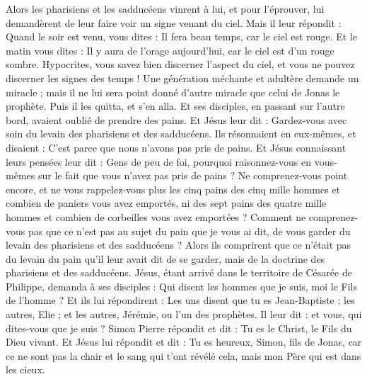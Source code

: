 \begin{multicols}{2}
\VerseOne{}Alors les pharisiens et les sadducéens vinrent à lui, et pour l'éprouver, lui demandèrent de leur faire voir un signe venant du ciel.
Mais il leur répondit : Quand le soir est venu, vous dites : Il fera beau temps, car le ciel est rouge.
Et le matin vous dites : Il y aura de l'orage aujourd'hui, car le ciel est d’un rouge sombre. Hypocrites, vous savez bien discerner l’aspect du ciel, et vous ne pouvez discerner les signes des temps !
Une génération méchante et adultère demande un miracle ; mais il ne lui sera point donné d'autre miracle que celui de Jonas le prophète. Puis il les quitta, et s'en alla.
Et ses disciples, en passant sur l’autre bord, avaient oublié de prendre des pains.
Et Jésus leur dit : Gardez-vous avec soin du levain des pharisiens et des sadducéens.
Ils résonnaient en eux-mêmes, et disaient : C’est parce que nous n'avons pas pris de pains.
Et Jésus connaissant leurs pensées leur dit : Gens de peu de foi, pourquoi raisonnez-vous en vous-mêmes sur le fait que vous n'avez pas pris de pains ?
Ne comprenez-vous point encore, et ne vous rappelez-vous plus les cinq pains des cinq mille hommes et combien de paniers vous avez emportés,
ni des sept pains des quatre mille hommes et combien de corbeilles vous avez emportées ?
Comment ne comprenez-vous pas que ce n’est pas au sujet du pain que je vous ai dit, de vous garder du levain des pharisiens et des sadducéens ?
Alors ils comprirent que ce n'était pas du levain du pain qu'il leur avait dit de se garder, mais de la doctrine des pharisiens et des sadducéens.
Jésus, étant arrivé dans le territoire de Césarée de Philippe, demanda à ses disciples : Qui disent les hommes que je suis, moi le Fils de l’homme ?
Et ils lui répondirent : Les uns disent que tu es Jean-Baptiste ; les autres, Elie ; et les autres, Jérémie, ou l'un des prophètes.
Il leur dit : et vous, qui dites-vous que je suis ?
Simon Pierre répondit et dit : Tu es le Christ, le Fils du Dieu vivant.
Et Jésus lui répondit et dit : Tu es heureux, Simon, fils de Jonas, car ce ne sont pas la chair et le sang qui t’ont révélé cela, mais mon Père qui est dans les cieux.

\end{multicols}
